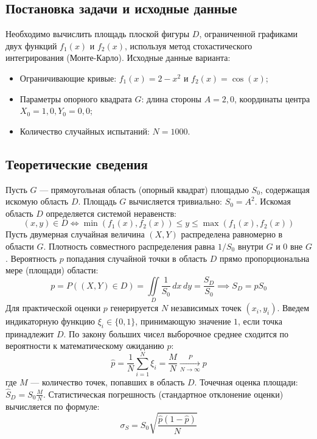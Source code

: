 \documentclass[a4paper,14pt]{extarticle}
\begin{document}
\subsection{Постановка задачи и исходные данные}
Необходимо вычислить площадь плоской фигуры $D$, ограниченной графиками двух функций $f_1(x)$ и $f_2(x)$, используя метод стохастического интегрирования (Монте-Карло). 
Исходные данные варианта:
\begin{itemize}
    \item Ограничивающие кривые: $f_1(x) = 2 - x^2$ и $f_2(x) = \cos(x)$;
    \item Параметры опорного квадрата $G$: длина стороны $A = 2,0$, координаты центра $X_0 = 1,0, Y_0 = 0,0$;
    \item Количество случайных испытаний: $N = 1000$.
\end{itemize}

\subsection{Теоретические сведения}
Пусть $G$ — прямоугольная область (опорный квадрат) площадью $S_0$, содержащая искомую область $D$. Площадь $G$ вычисляется тривиально: $S_0 = A^2$. Искомая область $D$ определяется системой неравенств:
\begin{equation}
    (x, y) \in D \iff \min(f_1(x), f_2(x)) \leq y \leq \max(f_1(x), f_2(x))
\end{equation}
Пусть двумерная случайная величина $(X,Y)$ распределена равномерно в области $G$. Плотность совместного распределения равна $1/S_0$ внутри $G$ и $0$ вне $G$. Вероятность $p$ попадания случайной точки в область $D$ прямо пропорциональна мере (площади) области:
\begin{equation}
    p = P((X, Y) \in D) = \iint\limits_{D} \frac{1}{S_0} \,dx\,dy = \frac{S_D}{S_0} \implies S_D = p S_0
\end{equation}
Для практической оценки $p$ генерируется $N$ независимых точек $(x_i, y_i)$. Введем индикаторную функцию $\xi_i \in \{0, 1\}$, принимающую значение $1$, если точка принадлежит $D$. По закону больших чисел выборочное среднее сходится по вероятности к математическому ожиданию $p$:
\begin{equation}
    \hat{p} = \frac{1}{N} \sum_{i=1}^{N} \xi_i = \frac{M}{N} \xrightarrow[N \to \infty]{P} p
\end{equation}
где $M$ — количество точек, попавших в область $D$. Точечная оценка площади: $\hat{S}_D = S_0 \frac{M}{N}$.
Статистическая погрешность (стандартное отклонение оценки) вычисляется по формуле:
\begin{equation}
    \sigma_{S} = S_0 \sqrt{\frac{\hat{p}(1-\hat{p})}{N}}
\end{equation}
\end{document}
